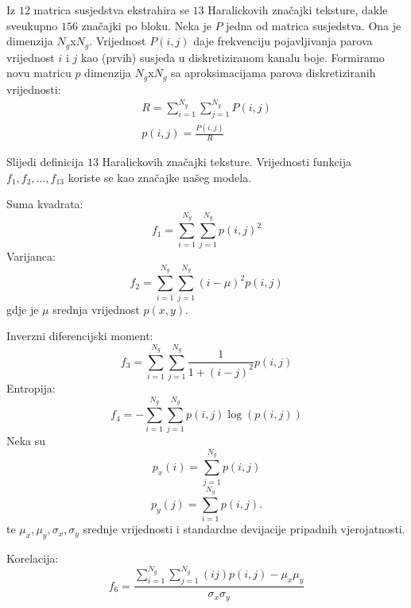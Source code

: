 \documentclass[seminar]{fer}
\begin{document}
Iz $12$ matrica susjedstva ekstrahira se $13$ Haralickovih značajki teksture, dakle sveukupno $156$ značajki po bloku. Neka je $P$ jedna od matrica susjedstva. Ona je dimenzija $N_g$x$N_g$. Vrijednost $P(i, j)$ daje frekvenciju pojavljivanja parova vrijednost $i$ i $j$ kao (prvih) susjeda u diskretiziranom kanalu boje. Formiramo novu matricu $p$ dimenzija $N_g$x$N_g$ sa aproksimacijama parova diskretiziranih vrijednosti:
\begin{equation*}
\begin{multlined}
R = \sum_{i = 1}^{N_g}\sum_{j = 1}^{N_g} P(i, j) \\
p(i, j) = \frac{P(i, j)}{R}
\end{multlined}
\end{equation*}

Slijedi definicija $13$ Haralickovih značajki teksture. Vrijednosti funkcija $f_1, f_2, \dots, f_{13}$ koriste se kao značajke našeg modela.

Suma kvadrata:
\begin{equation*}
f_1 = \sum_{i = 1}^{N_g}\sum_{j = 1}^{N_g} p(i, j) ^ 2
\end{equation*}
Varijanca:
\begin{equation*}
f_2 = \sum_{i = 1}^{N_g} \sum_{j = 1}^{N_g} (i - \mu) ^ 2 p(i, j)
\end{equation*}
gdje je $\mu$ srednja vrijednost $p(x, y)$.

Inverzni diferencijski moment:
\begin{equation}
f_3 = \sum_{i = 1}^{N_g} \sum_{j = 1}^{N_g} \frac{1}{1 + (i - j) ^ 2} p(i, j)
\end{equation}
Entropija:
\begin{equation*}
f_4 = - \sum_{i = 1}^{N_g} \sum_{j = 1}^{N_g} p(i, j) \log(p(i, j))
\end{equation*}
Neka su
\begin{equation*}
p_x(i) = \sum_{j = 1}^{N_g} p(i, j)
\end{equation*}
\begin{equation*}
p_y(j) = \sum_{i = 1}^{N_g} p(i, j).
\end{equation*}
te $\mu_x, \mu_y, \sigma_x, \sigma_y$ srednje vrijednosti i standardne devijacije pripadnih vjerojatnosti.

Korelacija:
\begin{equation*}
f_6 = \frac{\sum_{i = 1}^{N_g} \sum_{j = 1}^{N_g} (i j) p(i, j) - \mu_x \mu_y}{\sigma_x \sigma_y}
\end{equation*}
\end{document}

